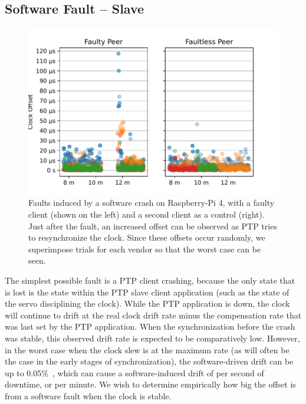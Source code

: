 \subsection{Software Fault -- Slave}

\xdef\bSoftwareFaultNumProfiles{\cmpMax}
\newcommand{\windowOfUncertaintyOneMinute}{(60*(0.05/100))}

\begin{figure}
    \includegraphics[width=\linewidth]{res/generated/fault/software/slave_rpi-4_peer_comparison.pdf}
    \caption{Faults induced by a software crash on Raspberry-Pi 4, with a faulty client (shown on the left) and a second client as a control (right). Just after the fault, an increased offset can be observed as PTP tries to resynchronize the clock. Since these offsets occur randomly, we superimpose \fNum{\bSoftwareFaultNumProfiles} trials for each vendor so that the worst case can be seen.}
    \label{fig:software_fault}
\end{figure}

The simplest possible fault is a PTP client crashing, because the only state that is lost is the state within the PTP slave client application (such as the state of the servo disciplining the clock). While the PTP application is down, the clock will continue to drift at the real clock drift rate minus the compensation rate that was last set by the PTP application. When the synchronization before the crash was stable, this observed drift rate is expected to be comparatively low. However, in the worst case when the clock slew is at the maximum rate (as will often be the case in the early stages of synchronization), the software-driven drift can be up to 0.05\%~\cite{adjtimex}, which can cause a software-induced drift of  per second of downtime, or \fTimeMS{\windowOfUncertaintyOneMinute} per minute. We wish to determine empirically how big the offset is from a software fault when the clock is stable.


